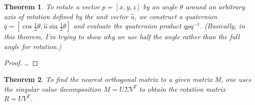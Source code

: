 \documentclass[a4paper,12pt]{article}
\newtheorem{theorem}{Theorem}
\begin{document}
\begin{theorem}
To rotate a vector $p = [x, y, z]$ by an angle $\theta$ around an arbitrary axis of rotation defined by the unit vector $\hat{u}$, we construct a quaternion $q = [\cos{\frac{1}{2}\theta}, \hat{u}\sin{\frac{1}{2}\theta}]$ and evaluate the quaternion product $qpq^{-1}$. (Basically, in this theorem, I'm trying to show why we use half the angle rather than the full angle for rotation.)
\end{theorem}

\begin{proof}
\dots
\end{proof}

\begin{theorem}
To find the nearest orthogonal matrix to a given matrix M, one uses the singular value decomposition $M = U\Sigma V^T$ to obtain the rotation matrix $R = U V^T$.
\end{theorem}
\end{document}
